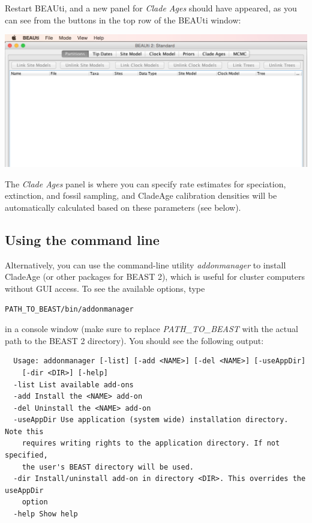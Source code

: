 \documentclass{article}
\begin{document}
\noindent
Restart BEAUti, and a new panel for \emph{Clade Ages} should have appeared, as you can see from the buttons in the top row of the BEAUti window:

\begin{center}\includegraphics[width=\textwidth]{fig4.png}\end{center}

\noindent
The \emph{Clade Ages} panel is where you can specify rate estimates for speciation, extinction, and fossil sampling, and CladeAge calibration densities will be automatically calculated based on these parameters (see below).

\subsection{Using the command line}

Alternatively, you can use the command-line utility \emph{addonmanager} to install CladeAge (or other packages for BEAST 2), which is useful for cluster computers without GUI access. To see the available options, type

\footnotesize
\begin{verbatim}
PATH_TO_BEAST/bin/addonmanager
\end{verbatim}
\normalsize

\noindent
in a console window (make sure to replace \emph{PATH\_TO\_BEAST} with the actual path to the BEAST 2 directory). You should see the following output:

\footnotesize
\begin{verbatim}
  Usage: addonmanager [-list] [-add <NAME>] [-del <NAME>] [-useAppDir]
    [-dir <DIR>] [-help] 
  -list List available add-ons
  -add Install the <NAME> add-on 
  -del Uninstall the <NAME> add-on 
  -useAppDir Use application (system wide) installation directory. Note this
    requires writing rights to the application directory. If not specified,
    the user's BEAST directory will be used.
  -dir Install/uninstall add-on in directory <DIR>. This overrides the useAppDir
    option
  -help Show help
\end{verbatim}
\normalsize
\end{document}

